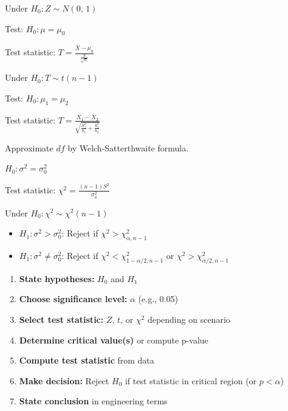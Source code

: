 Under $H_{0}: Z \sim N(0,\,1)$


Test: $H_{0}: \mu = \mu_{0}$

Test statistic: $T = \frac{\bar{X} - \mu_{0}}{\frac{S}{\sqrt{n}}}$

Under $H_{0}: T \sim t(n-1)$


Test: $H_{0}: \mu_{1} = \mu_{2}$

Test statistic: $T = \frac{\bar{X}_{1} - \bar{X}_{2}}{\sqrt{\frac{S_{1}^{2}}{n_{1}} + \frac{S_{2}^{2}}{n_{2}}}}$

Approximate $df$ by Welch-Satterthwaite formula.



$H_{0}: \sigma^{2} = \sigma_{0}^{2}$

Test statistic: $\chi^{2} = \frac{(n-1)S^{2}}{\sigma_{0}^{2}}$

Under $H_{0}: \chi^{2} \sim \chi^{2}(n-1)$


\begin{itemize}
\tightlist
\item
  $H_{1}: \sigma^{2} > \sigma_{0}^{2}$: Reject if $\chi^{2} > \chi^{2}_{\alpha, n-1}$
\item
  $H_{1}: \sigma^{2} \ne \sigma_{0}^{2}$: Reject if $\chi^{2} < \chi^{2}_{1-\alpha /2, n-1}$ or $\chi^{2} > \chi^{2}_{\alpha /2, n-1}$
\end{itemize}


\begin{enumerate}
\def\labelenumi{\arabic{enumi}.}
\tightlist
\item
  \textbf{State hypotheses:} $H_{0}$ and $H_{1}$
\item
  \textbf{Choose significance level:} $\alpha$ (e.g., 0.05)
\item
  \textbf{Select test statistic:} $Z,\, t$, or $\chi^{2}$ depending on scenario
\item
  \textbf{Determine critical value(s)} or compute p-value
\item
  \textbf{Compute test statistic} from data
\item
  \textbf{Make decision:} Reject $H_{0}$ if test statistic in critical region (or $p < \alpha$)
\item
  \textbf{State conclusion} in engineering terms
\end{enumerate}

